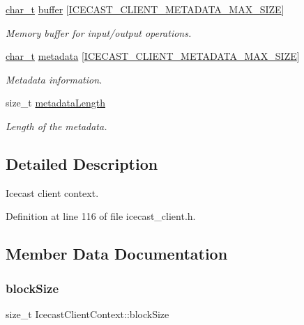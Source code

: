 \begin{DoxyCompactItemize}
\hyperlink{compiler__port_8h_a40bb5262bf908c328fbcfbe5d29d0201}{char\+\_\+t} \hyperlink{structIcecastClientContext_acc09df634fb4b61df4cd759e2f62a68a}{buffer} \mbox{[}\hyperlink{icecast__client_8h_adeb8d82a71fa7bed56f9a1a2471b2a56}{I\+C\+E\+C\+A\+S\+T\+\_\+\+C\+L\+I\+E\+N\+T\+\_\+\+M\+E\+T\+A\+D\+A\+T\+A\+\_\+\+M\+A\+X\+\_\+\+S\+I\+ZE}\mbox{]}
\begin{DoxyCompactList}\small\item\em Memory buffer for input/output operations. \end{DoxyCompactList}\item 
\hyperlink{compiler__port_8h_a40bb5262bf908c328fbcfbe5d29d0201}{char\+\_\+t} \hyperlink{structIcecastClientContext_a746986eafa63d50323d7d4602b295867}{metadata} \mbox{[}\hyperlink{icecast__client_8h_adeb8d82a71fa7bed56f9a1a2471b2a56}{I\+C\+E\+C\+A\+S\+T\+\_\+\+C\+L\+I\+E\+N\+T\+\_\+\+M\+E\+T\+A\+D\+A\+T\+A\+\_\+\+M\+A\+X\+\_\+\+S\+I\+ZE}\mbox{]}
\begin{DoxyCompactList}\small\item\em Metadata information. \end{DoxyCompactList}\item 
size\+\_\+t \hyperlink{structIcecastClientContext_a425bb275c42c40b5ea5b62831c867937}{metadata\+Length}
\begin{DoxyCompactList}\small\item\em Length of the metadata. \end{DoxyCompactList}\end{DoxyCompactItemize}


\subsection{Detailed Description}
Icecast client context. 

Definition at line 116 of file icecast\+\_\+client.\+h.



\subsection{Member Data Documentation}
\mbox{\label{structIcecastClientContext_a2efbe1b70c31245ba3305b8371a53fd5}} 
\subsubsection{\texorpdfstring{block\+Size}{blockSize}}
{\footnotesize\ttfamily size\+\_\+t Icecast\+Client\+Context\+::block\+Size}



